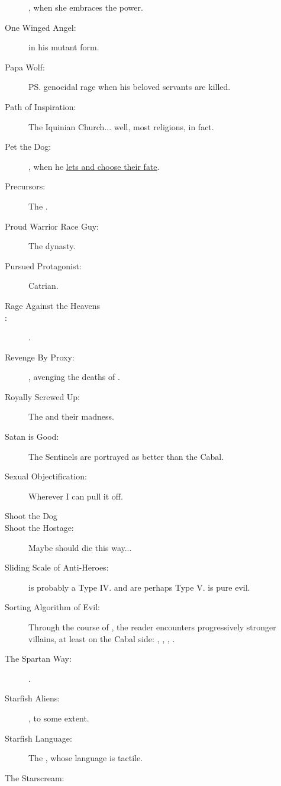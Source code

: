 \begin{flushleft}
\begin{description}
    \Tiamat, when she embraces the \xsic{} power. 
  \item[One Winged Angel:]
    \Teshrial{} in his mutant form. 
  \item[Papa Wolf:] 
    \ps{\Ishnaruchaefir} genocidal rage when his beloved servants are killed. 
  \item[Path of Inspiration:] 
    The Iquinian Church... well, most religions, in fact. 
  \item[Pet the Dog:] 
    \Secherdamon, when he \hyperref[Secherdamon lets Tiroco and Icor choose their fate]{lets \Tiroco{} and \Icor{} choose their fate}.
  \item[Precursors:] The . 
  \item[Proud Warrior Race Guy:] The \Mystraacht{} dynasty. 
  \item[Pursued Protagonist:] Catrian. 
  \item[Rage Against the Heavens] 
  \item[\trope{SanityHasAdvantages}{Sanity Has Advantages}:] \Sithiyacaan. 
  \item[Revenge By Proxy:] 
    \Ishnaruchaefir, avenging the deaths of . 
  \item[Royally Screwed Up:]
    The \satharioth and their madness. 
  \item[Satan is Good:] 
    The \daemonic{} Sentinels are portrayed as better than the Cabal. 
  \item[Sexual Objectification:] Wherever I can pull it off. 
  \item[Shoot the Dog] 
  \item[Shoot the Hostage:] Maybe  should die this way...
  \item[Sliding Scale of Anti-Heroes:] 
    \Ishnaruchaefir{} is probably a Type IV. 
    \Secherdamon{} and \Azraid{} are perhaps Type V. 
    \Vizsherioch{} is pure evil. 
  \item[Sorting Algorithm of Evil:] 
    Through the course of \SentinelsofMithEmph, the reader encounters progressively stronger villains, at least on the Cabal side: 
    \Teshrial, \Azraid, \Daggerrain, \Voidbringer.
  \item[The Spartan Way:]
    . 
  \item[Starfish Aliens:] 
    \Voyagers, \banes{} to some extent.
  \item[Starfish Language:] 
    The \banes, whose language is tactile. 
  \item[The Starscream:] 

\end{description}
\end{flushleft}
